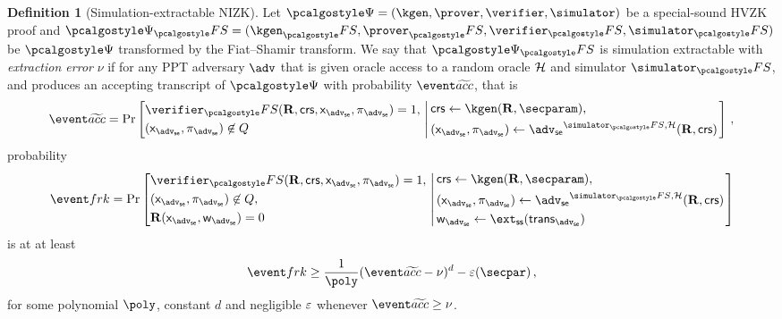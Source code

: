 \documentclass[runningheads,11pt]{llncs}
\theoremstyle{definition}
\newtheorem{definition}[theorem]{Definition}
\begin{document}
\begin{definition}[Simulation-extractable NIZK]
	\label{def:simext}
	Let $\ps = (\kgen, \prover, \verifier, \simulator)$ be a special-sound HVZK proof and $\ps_\fs = (\kgen_\fs, \prover_\fs, \verifier_\fs, \simulator_\fs)$ be $\ps$ transformed by the Fiat--Shamir transform. 
	We say that $\ps_\fs$ is simulation extractable with \emph{extraction error} $\nu$ if for any PPT adversary $\adv$ that is given oracle access to a random oracle $\mathcal{H}$ and simulator $\simulator_\fs$, and produces an accepting transcript of $\ps$ with probability
	$\waccProb$, that is
	\[
		\waccProb = \Pr \left[
		\begin{aligned}
			& \verifier_\fs(\REL, \crs, \inp_\advse, \zkproof_\advse) = 1,\\
			& (\inp_\advse, \zkproof_\advse) \not\in Q
		\end{aligned}
		\, \left| \,
		\begin{aligned}
			& \crs \gets \kgen(\REL, \secparam),\\
			& (\inp_\advse, \zkproof_\advse) \gets \advse^{\simulator_\fs, \ro} (\REL, \crs) 
		\end{aligned}
		\right.\right]\,,
	\]
	probability
	\[
		\frkProb = \Pr \left[
		\begin{aligned}
			& \verifier_\fs(\REL, \crs, \inp_\advse, \zkproof_\advse) = 1,\\
			& (\inp_\advse, \zkproof_\advse) \not\in Q,\\
			& \REL(\inp_\advse, \wit_\advse) = 0
		\end{aligned}
		\, \left| \,
		\begin{aligned}
			& \crs \gets \kgen(\REL, \secparam),\\
			& (\inp_\advse, \zkproof_\advse) \gets \advse^{\simulator_\fs, \ro} (\REL, \crs) \\
			& \wit_\advse \gets \ext_\ss (\trans_{\advse}) 
		\end{aligned}
		\right.\right]
	\]
	is at at least 
	\[
		\frkProb \geq \frac{1}{\poly} (\waccProb - \nu)^d - \eps(\secpar)\,,
	\]
	for some polynomial $\poly$, constant $d$ and negligible $\varepsilon$ whenever $\waccProb \geq \nu$.
\end{definition}
\end{document}
